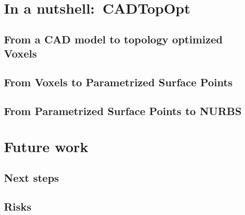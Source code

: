 \section{In a nutshell:\ \acl{CADTopOpt}}
\subsection{From a \acs{CAD} model to topology optimized Voxels}
\subsection{From Voxels to Parametrized Surface Points}
\subsection{From Parametrized Surface Points to \ac{NURBS}}

\section{Future work}

\subsection{Next steps}
\subsection{Risks}
